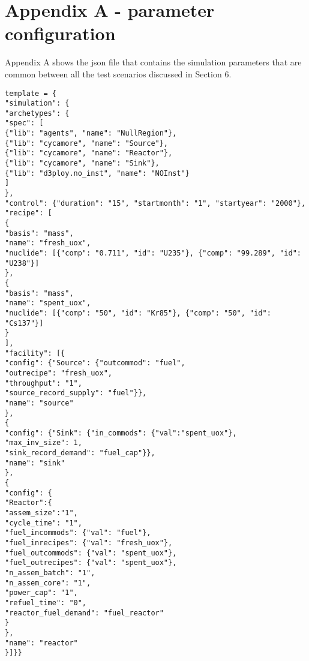 \documentclass[11pt,letterpaper]{article}
\begin{document}
\begin{comment}
\item Do the related fuel cycle facilities exit upon demand decrease?
\begin{verbatim}
TEST(ReactorTests, DDDeploy_NO) {
    [Example input with the following attributes:]
        [int simdur = 20;]
        [Defines reactor with zero refueling cycle and operation 
        cycle of 1 month]
        [Defines fuel cycle facilities parameters]
        [Defines Reactor Deploy Scheme / Power Demand]
        [Decreasing Fuel Demand with Time]
    [Run test]
    [Test if fuel facility is deployed in the beginning]
    [Test if fuel facility exits later in the simulation (have 
    analytic solution)]
}
\end{verbatim}


\end{enumerate}



\section{Advanced Fuel Cycles}
\end{comment}

\section*{Appendix A - parameter configuration}
Appendix A shows the json file that contains the simulation parameters that are common between all the test scenarios discussed in Section 6.  

\begin{verbatim}
template = {
"simulation": {
"archetypes": {
"spec": [
{"lib": "agents", "name": "NullRegion"}, 
{"lib": "cycamore", "name": "Source"}, 
{"lib": "cycamore", "name": "Reactor"},
{"lib": "cycamore", "name": "Sink"},
{"lib": "d3ploy.no_inst", "name": "NOInst"}
]
}, 
"control": {"duration": "15", "startmonth": "1", "startyear": "2000"}, 
"recipe": [
{
"basis": "mass", 
"name": "fresh_uox", 
"nuclide": [{"comp": "0.711", "id": "U235"}, {"comp": "99.289", "id": "U238"}]
}, 
{
"basis": "mass", 
"name": "spent_uox", 
"nuclide": [{"comp": "50", "id": "Kr85"}, {"comp": "50", "id": "Cs137"}]
}
], 
"facility": [{
"config": {"Source": {"outcommod": "fuel",
"outrecipe": "fresh_uox",
"throughput": "1",
"source_record_supply": "fuel"}}, 
"name": "source"
},
{
"config": {"Sink": {"in_commods": {"val":"spent_uox"},
"max_inv_size": 1,
"sink_record_demand": "fuel_cap"}}, 
"name": "sink"
},
{
"config": {
"Reactor":{
"assem_size":"1",
"cycle_time": "1", 
"fuel_incommods": {"val": "fuel"}, 
"fuel_inrecipes": {"val": "fresh_uox"}, 
"fuel_outcommods": {"val": "spent_uox"}, 
"fuel_outrecipes": {"val": "spent_uox"}, 
"n_assem_batch": "1", 
"n_assem_core": "1", 
"power_cap": "1", 
"refuel_time": "0",
"reactor_fuel_demand": "fuel_reactor"
}
},
"name": "reactor"
}]}}
\end{verbatim}
\end{document}

